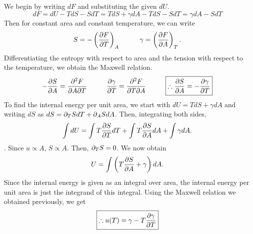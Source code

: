         We begin by writing \(dF\) and substituting the given \(dU\).
        \begin{equation}
            dF = dU - TdS - SdT = TdS + \gamma dA - TdS - SdT = \gamma dA - SdT
        \end{equation}
        Then for constant area and constant temperature, we can write
        \begin{equation}
            S=-\left( \frac{\partial F}{\partial T} \right)_A \hspace{1cm }\gamma = \left( \frac{\partial F}{\partial A} \right)_T.
        \end{equation}
        Differentiating the entropy with respect to area and the tension  with respect to the temperature, we obtain the Maxwell relation.
        \begin{equation}
            -\frac{\partial S}{\partial A} = \frac{\partial ^2F}{\partial A\partial T} \hspace{1cm} \frac{\partial \gamma}{\partial T} = \frac{\partial ^2F}{\partial T\partial A} \hspace{1cm }            \boxed{\therefore \frac{\partial S}{\partial A}=-\frac{\partial \gamma}{\partial T}}
        \end{equation}
        To find the internal energy per unit area, we start with \(dU=TdS+\gamma dA\) and writing \(dS\) as \(dS=\partial_TSdT+\partial_ASdA\). Then, integrating both sides,
        \begin{equation}
            \int dU = \int T\frac{\partial S}{\partial T}dT + \int T\frac{\partial S}{\partial A}dA + \int\gamma dA.
        \end{equation}.
        Since \(u\propto A\), \(S\propto A\). Then, \(\partial_TS=0\). We now obtain
        \begin{equation}
            U = \int\left( T\frac{\partial S}{\partial A}+\gamma \right)dA.
        \end{equation}
        Since the internal energy is given as an integral over area, the internal energy per unit area is just the integrand of this integral. Using the Maxwell relation we obtained previously, we get
        \begin{equation}
            \boxed{\therefore u(T) = \gamma -T\frac{\partial \gamma}{\partial T}}
        \end{equation}